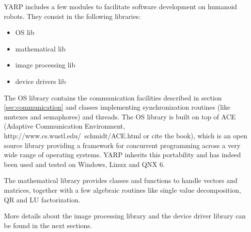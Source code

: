 YARP includes a few modules to facilitate software development on
humanoid robots. They consist in the following libraries:

\begin{itemize}
\item{OS lib}
\item{mathematical lib}
\item{image processing lib}
\item{device drivers lib}
\end{itemize}

The OS library contains the communication facilities described in
section \ref{sec:communication} and classes implementing
synchronization routines (like mutexes and semaphores) and
threads. The OS library is built on top of ACE (Adaptive Communication
Environment, http://www.cs.wustl.edu/~schmidt/ACE.html or cite the
book), which is an open source library providing a framework for
concurrent programming across a very wide range of operating
systems. YARP inherits this portability and has indeed been used and
tested on Windows, Linux and QNX 6.

The mathematical library provides classes and functions to handle
vectors and matrices, together with a few algebraic routines like
single value decomposition, QR and LU factorization.

More details about the image processing library and the device driver
library can be found in the next sections.
